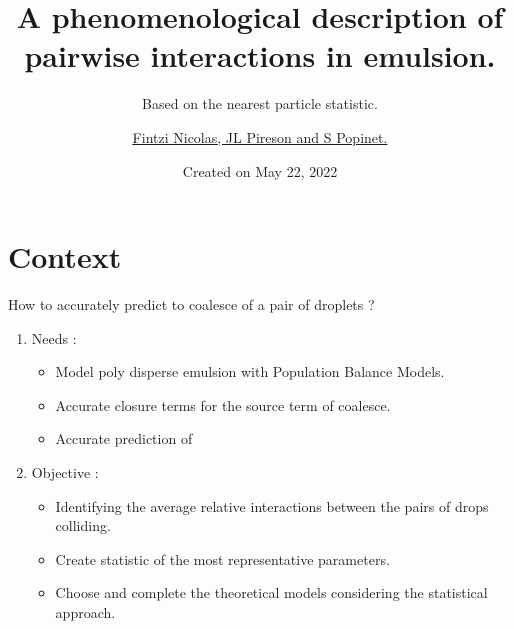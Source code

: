\documentclass{sintefbeamer}
\title{A phenomenological description of pairwise interactions in emulsion.}
\subtitle{Based on the nearest particle statistic.}
\author{\href{http://basilisk.fr/sandbox/fintzin/Rising-Suspenion/RS.c}{\underline{Fintzi Nicolas}, JL Pireson and S Popinet. }}
\date{Created on May 22, 2022}
\begin{document}
\maketitle
\section*{Context}

\begin{frame}{How to accurately predict to coalesce of a pair of droplets ?}

\begin{enumerate}
  \item Needs :
  \begin{itemize}
    \item Model poly disperse emulsion with Population Balance Models. 
    \item Accurate closure terms for the source term of coalesce. 
    \item Accurate prediction of 
  \end{itemize}
  \item Objective :
  \begin{itemize}
    \item Identifying the average relative interactions between the pairs of drops colliding.  
    \item Create statistic of the most representative parameters.
    \item Choose and complete the theoretical models considering the statistical approach.   
  \end{itemize}
\end{enumerate}
\end{frame}
\end{document}

